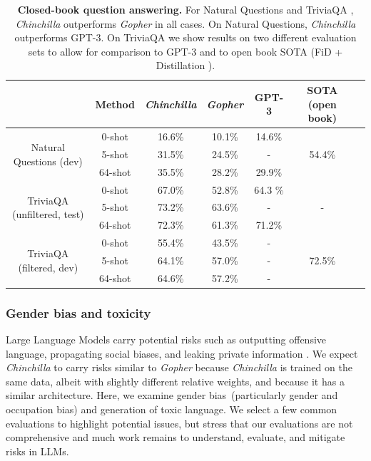 \documentclass[11pt, a4paper, logo, copyright, nonumbering]{deepmind}
\newcommand{\gopher}{\textit{Gopher}\xspace}
\newcommand{\chinchilla}{\textit{Chinchilla}\xspace}
\begin{document}
\begin{table}[t]
    \centering
    \begin{tabular}{c c c c c c c}
    \toprule
    & Method & \chinchilla & \gopher & GPT-3 & SOTA (open book) \\
    \midrule
    \multirow{3}{*}{Natural Questions (dev)} & 0-shot & 16.6\% &  10.1\% &  14.6\%  & \multirow{3}{*}{54.4\%} \\
    & 5-shot & 31.5\% & 24.5\% & -  & \\
    & 64-shot & 35.5\% & 28.2\% & 29.9\% &  \\
    \midrule
    \multirow{3}{*}{TriviaQA (unfiltered, test)} & 0-shot & 67.0\% & 52.8\% & 64.3 \% & \multirow{3}{*}{-} \\
    & 5-shot & 73.2\% & 63.6\%  &  - &   \\
    & 64-shot & 72.3\% & 61.3\% & 71.2\% & \\
    \midrule
    \multirow{3}{*}{TriviaQA (filtered, dev)} & 0-shot & 55.4\% & 43.5\% & - & \multirow{3}{*}{72.5\%} \\
    & 5-shot &  64.1\% &  57.0\% &  - &   \\
    & 64-shot & 64.6\% & 57.2\% & - & \\
    \bottomrule
    \end{tabular}
    \caption{\textbf{Closed-book question answering.}
    For Natural Questions \citep{naturalquestions} and TriviaQA \citep{triviaqa}, \chinchilla outperforms \gopher in all cases. On Natural Questions, \chinchilla outperforms GPT-3. On TriviaQA we show results on two different evaluation sets to allow for comparison to GPT-3 and to open book SOTA (FiD + Distillation \citep{izacard2020distilling}).
    }
    \label{tab:QA}
\end{table}

\subsubsection{Gender bias and toxicity}
Large Language Models carry potential risks such as outputting offensive language, propagating social biases, and leaking private information \citep{weidinger2021harms,bender2021dangers}.
We expect \chinchilla to carry risks similar to \gopher because \chinchilla is trained on the same data, albeit with slightly different relative weights, and because it has a similar architecture.
Here, we examine gender bias~(particularly gender and occupation bias) and generation of toxic language.
We select a few common evaluations to highlight potential issues, but stress that our evaluations are not comprehensive and much work remains to understand, evaluate, and mitigate risks in LLMs. 
\end{document}

